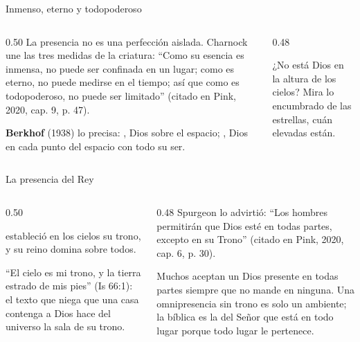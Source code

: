 \begin{frame}{Inmenso, eterno y todopoderoso}
\begin{columns}[c,onlytextwidth]
\begin{column}{0.50\textwidth}\scriptsize
La presencia no es una perfección aislada. Charnock une las tres medidas de la criatura: ``Como su esencia es inmensa, no puede ser confinada en un lugar; como es eterno, no puede medirse en el tiempo; así que como es todopoderoso, no puede ser limitado'' (citado en Pink, 2020, cap. 9, p. 47).\par\medskip
\textbf{Berkhof} (1938) lo precisa: , Dios sobre el espacio; , Dios en cada punto del espacio con todo su ser.
\end{column}
\begin{column}{0.48\textwidth}
\begin{cita}[fontupper=\scriptsize\itshape]¿No está Dios en la altura de los cielos? Mira lo encumbrado de las estrellas, cuán elevadas están.\end{cita}
\end{column}
\end{columns}
\end{frame}

\begin{frame}{La presencia del Rey}
\begin{columns}[c,onlytextwidth]
\begin{column}{0.50\textwidth}
\begin{cita}[fontupper=\scriptsize\itshape]\SENOR{} estableció en los cielos su trono, y su reino domina sobre todos.\end{cita}
\scriptsize ``El cielo es mi trono, y la tierra estrado de mis pies'' (Is 66:1): el texto que niega que una casa contenga a Dios hace del universo la sala de su trono. 
\end{column}
\begin{column}{0.48\textwidth}\scriptsize
Spurgeon lo advirtió: ``Los hombres permitirán que Dios esté en todas partes, excepto en su Trono'' (citado en Pink, 2020, cap. 6, p. 30).\par\medskip
Muchos aceptan un Dios presente en todas partes siempre que no mande en ninguna. Una omnipresencia sin trono es solo un ambiente; la bíblica es la del Señor que está en todo lugar porque todo lugar le pertenece.
\end{column}
\end{columns}
\end{frame}

